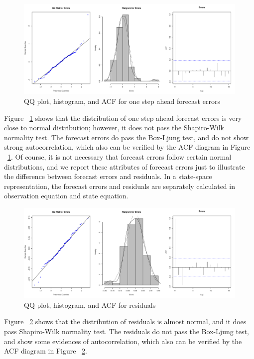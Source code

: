 \begin{figure}[ht]
	\centering
	\includegraphics[width=1\linewidth]{Figures/errors3_hist}
	\caption{QQ plot, histogram, and ACF for one step ahead forecast errors}
	\label{fig:errors_hist}
\end{figure}


Figure  ~\ref{fig:errors_hist} shows that the distribution of one step ahead forecast errors is very close to normal distribution; however, it does not pass the  Shapiro-Wilk normality test. The forecast errors do  pass the Box-Ljung test, and do not show strong autocorrelation, which also can be verified by the ACF diagram in Figure  ~\ref{fig:errors_hist}. Of course, it is not necessary that forecast errors follow certain normal distributions, and we report these attributes of forecast errors just to illustrate the difference between forecast errors and residuals. In a state-space representation, the forecast errors and residuals are separately calculated in observation equation and state equation.      


\begin{figure}[ht]
	\centering
	\includegraphics[width=1\linewidth]{Figures/residuals_hist}
	\caption{QQ plot, histogram, and ACF for residuals}
	\label{fig:residuals_hist}
\end{figure}


Figure  ~\ref{fig:residuals_hist} shows that the distribution of residuals is almost normal, and it does pass Shapiro-Wilk normality test. The residuals do not pass the Box-Ljung test, and show some evidences of autocorrelation, which also can be verified by the ACF diagram in Figure  ~\ref{fig:residuals_hist}. 

